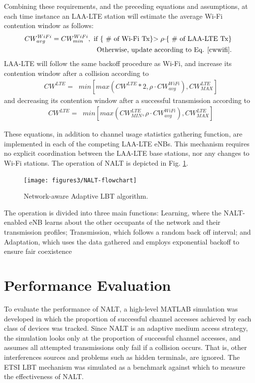 Combining these requirements, and the preceding equations and assumptions, at each time instance an \mbox{LAA-LTE} station will estimate the average \mbox{Wi-Fi} contention window as follows:
\begin{align}
CW^{WiFi}_{avg} = CW^{WiFi}_{min}, \text{  if \{ \# of \mbox{Wi-Fi} Tx\}$> \rho\cdot$\{  \# of \mbox{LAA-LTE} Tx\}}\notag\\ 
\text{Otherwise, update according to Eq. \ref{cwwifi}.}
\end{align}
\mbox{LAA-LTE} will follow the same backoff procedure as \mbox{Wi-Fi}, and increase its contention window after a collision according to
\begin{align}
&CW^{LTE}=\;\;min\left[max\left(CW^{LTE}*2,\rho \cdot CW^{WiFi}_{avg}\right), CW^{LTE}_{MAX}\right]
\end{align}
and decreasing its contention window after a successful transmission according to 
\begin{align}
&CW^{LTE}=\;\;min\left[max\left(CW^{LTE}_{MIN},\rho \cdot CW^{WiFi}_{avg}\right), CW^{LTE}_{MAX}\right]
\end{align}

These equations, in addition to channel usage statistics gathering function, are implemented in each of the competing LAA-LTE eNBs.  This mechanism requires no explicit coordination between the LAA-LTE base stations, nor any changes to Wi-Fi stations. The operation of NALT is depicted in Fig. \ref{NALT-flowchart}. 
\begin{figure}[!ht]
	\centering
	\texttt{[image: figures3/NALT-flowchart]}
	\caption{Network-aware Adaptive LBT algorithm.}
	\label{NALT-flowchart}
\end{figure}%
The operation is divided into three main functions: Learning, where the NALT-enabled eNB learns about the other occupants of the network and their transmission profiles; Transmission, which follows a random back off interval; and Adaptation, which uses the data gathered and employs exponential backoff to ensure fair coexistence


\section{Performance Evaluation}\label{perf-eval}
To evaluate the performance of NALT, a high-level MATLAB simulation was developed in which the proportion of successful channel accesses achieved by each class of devices was tracked. Since NALT is an adaptive medium access strategy, the simulation looks only at the proportion of successful channel accesses, and assumes all attempted transmissions only fail if a collision occurs.  That is, other interferences sources and problems such as hidden terminals, are ignored.  The ETSI LBT mechanism was simulated as a benchmark against which to measure the effectiveness of NALT.


